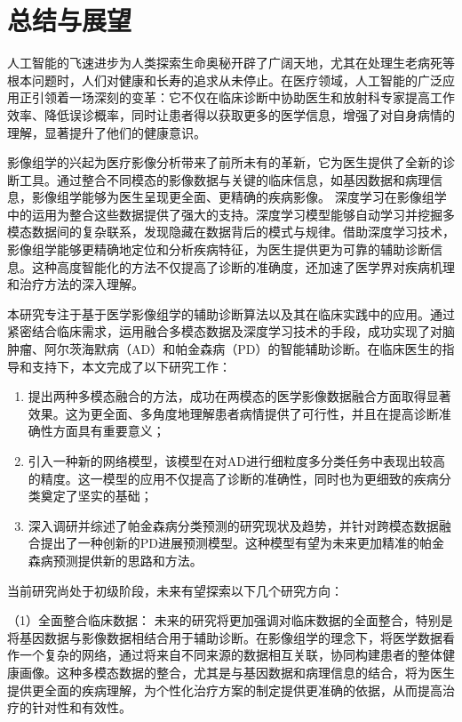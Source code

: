 \chapter{总结与展望} \label{chapter:Conclusions}
人工智能的飞速进步为人类探索生命奥秘开辟了广阔天地，尤其在处理生老病死等根本问题时，人们对健康和长寿的追求从未停止。在医疗领域，人工智能的广泛应用正引领着一场深刻的变革：它不仅在临床诊断中协助医生和放射科专家提高工作效率、降低误诊概率，同时让患者得以获取更多的医学信息，增强了对自身病情的理解，显著提升了他们的健康意识。

影像组学的兴起为医疗影像分析带来了前所未有的革新，它为医生提供了全新的诊断工具。通过整合不同模态的影像数据与关键的临床信息，如基因数据和病理信息，影像组学能够为医生呈现更全面、更精确的疾病影像。
深度学习在影像组学中的运用为整合这些数据提供了强大的支持。深度学习模型能够自动学习并挖掘多模态数据间的复杂联系，发现隐藏在数据背后的模式与规律。借助深度学习技术，影像组学能够更精确地定位和分析疾病特征，为医生提供更为可靠的辅助诊断信息。这种高度智能化的方法不仅提高了诊断的准确度，还加速了医学界对疾病机理和治疗方法的深入理解。

本研究专注于基于医学影像组学的辅助诊断算法以及其在临床实践中的应用。通过紧密结合临床需求，运用融合多模态数据及深度学习技术的手段，成功实现了对脑肿瘤、阿尔茨海默病（AD）和帕金森病（PD）的智能辅助诊断。在临床医生的指导和支持下，本文完成了以下研究工作：
\begin{enumerate}
\item 提出两种多模态融合的方法，成功在两模态的医学影像数据融合方面取得显著效果。这为更全面、多角度地理解患者病情提供了可行性，并且在提高诊断准确性方面具有重要意义；
\item 引入一种新的网络模型，该模型在对AD进行细粒度多分类任务中表现出较高的精度。这一模型的应用不仅提高了诊断的准确性，同时也为更细致的疾病分类奠定了坚实的基础；
\item 深入调研并综述了帕金森病分类预测的研究现状及趋势，并针对跨模态数据融合提出了一种创新的PD进展预测模型。这种模型有望为未来更加精准的帕金森病预测提供新的思路和方法。
\end{enumerate}


当前研究尚处于初级阶段，未来有望探索以下几个研究方向：

（1）全面整合临床数据： 未来的研究将更加强调对临床数据的全面整合，特别是将基因数据与影像数据相结合用于辅助诊断。在影像组学的理念下，将医学数据看作一个复杂的网络，通过将来自不同来源的数据相互关联，协同构建患者的整体健康画像。这种多模态数据的整合，尤其是与基因数据和病理信息的结合，将为医生提供更全面的疾病理解，为个性化治疗方案的制定提供更准确的依据，从而提高治疗的针对性和有效性。


